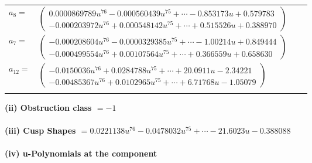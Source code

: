\documentclass[1p]{elsarticle_modified}
\theoremstyle{definition}
\begin{document}
\begin{tabular}{m{7pt} m{180pt} m{7pt} m{180pt} }
\flushright $a_{8}=$&$\begin{pmatrix}0.0000869789 u^{76}-0.000560439 u^{75}+\cdots-0.853173 u+0.579783\\-0.000203972 u^{76}+0.000548142 u^{75}+\cdots+0.515526 u+0.388970\end{pmatrix}$ \\
\flushright $a_{7}=$&$\begin{pmatrix}-0.000208604 u^{76}-0.0000329385 u^{75}+\cdots-1.00214 u+0.849444\\-0.000499554 u^{76}+0.00107564 u^{75}+\cdots+0.366559 u+0.658630\end{pmatrix}$ \\
\flushright $a_{12}=$&$\begin{pmatrix}-0.0150036 u^{76}+0.0284788 u^{75}+\cdots+20.0911 u-2.34221\\-0.00485367 u^{76}+0.0102965 u^{75}+\cdots+6.71768 u-1.05079\end{pmatrix}$\\&\end{tabular}
\flushleft \textbf{(ii) Obstruction class $= -1$}\\~\\
\flushleft \textbf{(iii) Cusp Shapes $= 0.0221138 u^{76}-0.0478032 u^{75}+\cdots-21.6023 u-0.388088$}\\~\\
\newpage\renewcommand{\arraystretch}{1}
\flushleft \textbf{(iv) u-Polynomials at the component}\newline \\
\end{document}
